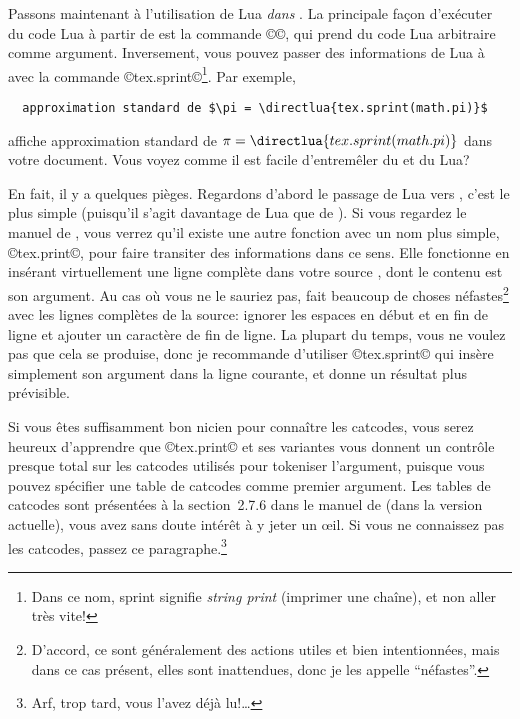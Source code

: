 \documentclass{lltxdoc}
\begin{document}
\medskip

Passons maintenant à l'utilisation de Lua \emph{dans} \luatex. La principale
façon d'exécuter du code Lua à partir de \tex est la commande ©\directlua©,
qui prend du code Lua arbitraire comme argument. Inversement, vous pouvez
passer des informations de Lua à \tex avec la commande ©tex.sprint©\footnote{Dans
  ce nom, \og{}sprint\fg{} signifie \og{}\emph{string print}\fg{}
  (\og{}imprimer une chaîne\fg{}), et non \og{}aller très vite\fg{}!}.
Par exemple,
\begin{Verbatim}
  approximation standard de $\pi = \directlua{tex.sprint(math.pi)}$
\end{Verbatim}
affiche \og{}approximation standard de $\pi = \directlua{tex.sprint(math.pi)}$\fg
dans votre document. Vous voyez comme il est facile d'entremêler du \tex et du Lua?

En fait, il y a quelques pièges. Regardons d'abord le passage de Lua vers \tex,
c'est le plus simple (puisqu'il s'agit davantage de Lua que de \tex).
Si vous regardez le manuel de \luatex, vous verrez qu'il existe une autre fonction
avec un nom plus simple, ©tex.print©, pour faire transiter des informations
dans ce sens. Elle fonctionne en insérant virtuellement une ligne complète
dans votre source \tex, dont le contenu est son argument. Au cas où vous ne
le sauriez pas, \tex fait beaucoup de choses néfastes\footnote{D'accord, ce
  sont généralement des actions utiles et bien intentionnées, mais dans ce
  cas présent, elles sont inattendues, donc je les appelle ``néfastes''.} avec
les lignes complètes de la source: ignorer les espaces en début et en fin
de ligne et ajouter un caractère de fin de ligne. La plupart du temps, vous
ne voulez pas que cela se produise, donc je recommande d'utiliser ©tex.sprint©
qui insère simplement son argument dans la ligne courante, et donne un résultat
plus prévisible.

Si vous êtes suffisamment bon \tex{}nicien pour connaître les catcodes,
vous serez heureux d'apprendre que ©tex.print© et ses variantes vous donnent
un contrôle presque total sur les catcodes utilisés pour tokeniser l'argument,
puisque vous pouvez spécifier une table de catcodes comme premier argument.
Les tables de catcodes sont présentées à la section~2.7.6 dans le manuel de
\luatex (dans la version actuelle), vous avez sans doute intérêt à y jeter
un \oe il. Si vous ne connaissez pas les catcodes, passez ce
paragraphe.\footnote{Arf, trop tard, vous l'avez déjà lu!\dots}

\medskip
\end{document}
